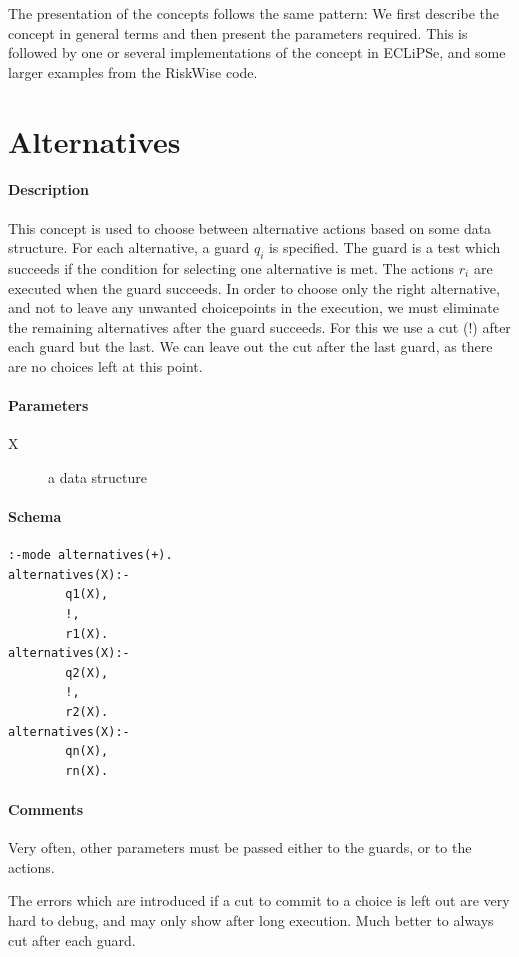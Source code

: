\documentclass[a4paper,12pt]{report}
\begin{document}
The presentation of the concepts follows the same pattern: We first describe the 
concept in general terms and then present the parameters required. This is 
followed by one or several implementations of the concept in ECLiPSe, and 
some larger examples from the RiskWise code.

\pagebreak
\section{Alternatives}
\paragraph{Description} This concept is used to choose between alternative actions 
based on some data structure. For each alternative, a guard $q_{i}$ is specified. 
The guard is a test which succeeds if the condition for selecting one alternative 
is met. The actions $r_{i}$ are executed when the guard succeeds. In order to choose 
only the right alternative, and not to leave any unwanted choicepoints in the 
execution, we must eliminate the remaining alternatives after the guard succeeds. For 
this we use a cut (!) after each guard but the last. We can leave out the cut after 
the last guard, as there are no choices left at this point.
\paragraph{Parameters}
\begin{description}
\item[X] a data structure
\end{description}
\paragraph{Schema}
\begin{verbatim}
:-mode alternatives(+).
alternatives(X):-
        q1(X),
        !,
        r1(X).
alternatives(X):-
        q2(X),
        !,
        r2(X).
alternatives(X):-
        qn(X),
        rn(X).
\end{verbatim}
\paragraph{Comments}
Very often, other parameters must be passed either to the guards, or to the actions. 

The errors which are introduced if a cut to commit to a choice is left out are 
very hard to debug, and may only show after long execution. Much better to 
always cut after each guard.
\end{document}
